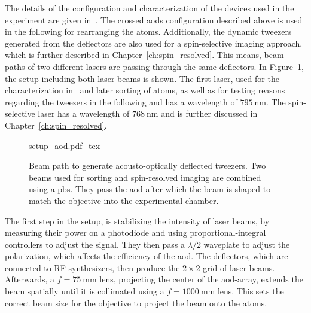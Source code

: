 \begin{figure}[tbp]%
\end{figure}

The details of the configuration and characterization of the devices used in the experiment are given in~\cite{Osterholz2020}. The crossed \acp{aod} configuration described above is used in the following for rearranging the atoms. Additionally, the dynamic tweezers generated from the deflectors are also used for a spin-selective imaging approach, which is further described in Chapter~\ref{ch:spin_resolved}. This means, beam paths of two different lasers are passing through the same deflectors. In Figure~\ref{fig:setup_aod}, the setup including both laser beams is shown. The first laser, used for the characterization in~\cite{Osterholz2020} and later sorting of atoms, as well as for testing reasons regarding the tweezers in the following and has a wavelength of $\SI{795}{\nano\meter}$. The spin-selective laser has a wavelength of $\SI{768}{\nano\meter}$ and is further discussed in Chapter~\ref{ch:spin_resolved}.

\begin{figure}[tbp]%
\centering
{setup_aod.pdf_tex}
\caption{Beam path to generate acousto-optically deflected tweezers. Two beams used for sorting and spin-resolved imaging are combined using a \ac{pbs}. They pass the \ac{aod} after which the beam is shaped to match the objective into the experimental chamber.}%
\label{fig:setup_aod}
\end{figure}

The first step in the setup, is stabilizing the intensity of laser beams, by measuring their power on a photodiode and using proportional-integral controllers to adjust the signal. They then pass a $\lambda/2$ waveplate to adjust the polarization, which affects the efficiency of the \ac{aod}. The deflectors, which are connected to RF-synthesizers, then produce the $2\times2$ grid of laser beams. Afterwards, a $f=\SI{75}{\milli\meter}$ lens, projecting the center of the \ac{aod}-array, extends the beam spatially until it is collimated using a $f=\SI{1000}{\milli\meter}$ lens. This sets the correct beam size for the objective to project the beam onto the atoms.

